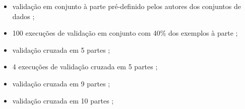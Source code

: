 \begin{itemize}
 \item validação em conjunto à parte pré-definido pelos autores dos conjuntos de dados \cite{conf/cikm/ErtekinHBG07};
 \item 100 execuções de validação em conjunto com 40\% dos exemplos à parte \cite{journals/jmlr/BaramEL04}; %
 \item validação cruzada em 5 partes \cite{chen2015study,settles2008active,conf/ecml/LomaskyBAWF07,conf/ecir/XuAZ07}; %
 \item 4 execuções de validação cruzada em 5 partes \cite{conf/ijcai/BeckerO05,conf/icml/MusleaMK02}; %
 \item validação cruzada em 9 partes \cite{conf/iswc/StikicLS08}; %
 \item validação cruzada em 10 partes \cite{settles2008active}; %

\end{itemize}
